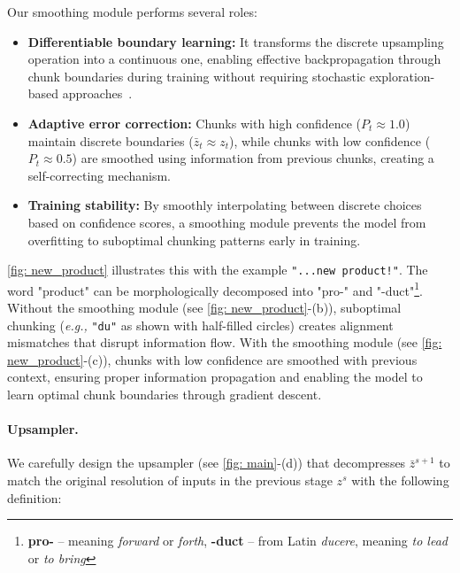 \documentclass{article}
\newcommand{\citep}{\parencite}
\newcommand{\smoother}{smoothing module}
\newcommand{\upsampler}{upsampler}
\newcommand{\Upsampler}{Upsampler}
\newcommand{\eg}{\emph{e.g.,}}
\theoremstyle{plain}
\theoremstyle{remark}
\begin{document}
Our \smoother{} performs several roles:
\begin{itemize}
    \item \textbf{Differentiable boundary learning:} It transforms the discrete upsampling operation into a continuous one, enabling effective backpropagation through chunk boundaries during training without requiring stochastic exploration-based approaches~\citep{GumbelSoftmax}.
    \item \textbf{Adaptive error correction:} Chunks with high confidence ($P_t \approx 1.0$) maintain discrete boundaries ($\bar{z}_t \approx z_t$), while chunks with low confidence ($P_t \approx 0.5$) are smoothed using information from previous chunks, creating a self-correcting mechanism.
    \item \textbf{Training stability:} By smoothly interpolating between discrete choices based on confidence scores, a \smoother{} prevents the model from overfitting to suboptimal chunking patterns early in training.
\end{itemize}

\cref{fig: new_product} illustrates this with the example \texttt{"...new product!"}.
The word "product" can be morphologically decomposed into "pro-" and "-duct"\footnote{\textbf{pro-} -- meaning \emph{forward} or \emph{forth}, \textbf{-duct} -- from Latin \emph{ducere}, meaning \emph{to lead} or \emph{to bring}}.
Without the \smoother{} (see \cref{fig: new_product}-(b)), suboptimal chunking (\eg{} \texttt{"du"} as shown with half-filled circles) creates alignment mismatches that disrupt information flow.
With the \smoother{} (see \cref{fig: new_product}-(c)), chunks with low confidence are smoothed with previous context, ensuring proper information propagation and enabling the model to learn optimal chunk boundaries through gradient descent.

\paragraph{\Upsampler{}.}

We carefully design the \upsampler{} (see \cref{fig: main}-(d)) that decompresses $\bar{z}^{s+1}$ to match the original resolution of inputs in the previous stage $z^{s}$ with the following definition:
\end{document}
